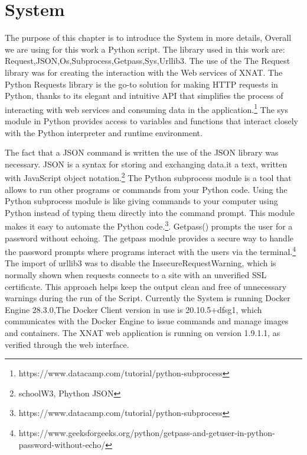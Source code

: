 \chapter{System}

The purpose of this chapter is to introduce the System in more details, Overall we are using for this work a Python script. The library  used in this work are: Request,JSON,Os,Subprocess,Getpass,Sys,Urllib3.
The use of the The Request library was for creating the interaction with the Web services of XNAT. The Python Requests library is the go-to solution for making HTTP requests in Python, thanks to its elegant and intuitive API that simplifies the process of interacting with web services and consuming data in the application.\footnote{https://www.datacamp.com/tutorial/python-subprocess} The sys module in Python provides access to variables and functions that interact closely with the Python interpreter and runtime environment. 

The fact that a JSON command is written the use of the JSON library was necessary. JSON is a syntax for storing and exchanging data.it a text, written with JavaScript object notation.\footnote{schoolW3, Phython JSON}
The Python subprocess module is a tool that allows to run other programs or commands from your Python code. Using the Python subprocess module is like giving commands to your computer using Python instead of typing them directly into the command prompt. This module makes it easy to automate the Python code.\footnote{https://www.datacamp.com/tutorial/python-subprocess}. Getpass() prompts the user for a password without echoing. The getpass module provides a secure way to handle the password prompts where programs interact with the users via the terminal.\footnote{https://www.geeksforgeeks.org/python/getpass-and-getuser-in-python-password-without-echo/}
 The import of urllib3 was to disable the InsecureRequestWarning, which is normally shown when requests connects to a site with an unverified SSL certificate. This approach helps keep the output clean and free of unnecessary warnings during the run of the Script.
 Currently the System is running Docker Engine 28.3.0,The Docker Client version in use is 20.10.5+dfsg1, which communicates with the Docker Engine to issue commands and manage images and containers. The XNAT web application is running on version 1.9.1.1, as verified through the web interface. 
 

